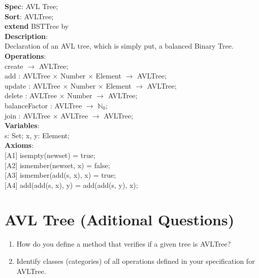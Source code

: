 \documentclass[12pt]{article}
\begin{document}
\begin{spacing}{1.5}
\noindent \textbf{Spec}: AVL Tree;\\
\noindent \textbf{Sort}: AVLTree;\\
\noindent \textbf{extend} BSTTree by\\
\noindent \textbf{Description}:\\Declaration of an AVL tree, which is simply put, a balanced Binary Tree.\\
\noindent \textbf{Operations}:\\
\hspace*{5mm} create $\rightarrow$ AVLTree;\\
\hspace*{5mm} add : AVLTree $\times$ Number $\times$ Element $\rightarrow$ AVLTree;\\
\hspace*{5mm} update : AVLTree $\times$ Number $\times$ Element $\rightarrow$ AVLTree;\\
\hspace*{5mm} delete : AVLTree $\times$ Number $\rightarrow$ AVLTree;\\
\hspace*{5mm} balanceFactor :  AVLTree $\rightarrow$ $\mathbb{N}_0$;\\
\hspace*{5mm} join : AVLTree $\times$ AVLTree $\rightarrow$ AVLTree;\\
\noindent \textbf{Variables}:\\
\hspace*{5mm} s: Set; x, y: Element;\\
\noindent \textbf{Axioms}:\\
\hspace*{5mm} [A1] isempty(newset) = true;\\
\hspace*{5mm} [A2] ismember(newset, x) = false;\\
\hspace*{5mm} [A3] ismember(add(s, x), x) = true;\\
\hspace*{5mm} [A4] add(add(s, x), y) = add(add(s, y), x);\\

\section*{AVL Tree (Aditional Questions)}

\begin{enumerate}

\item How do you define a method that verifies if a given tree is AVLTree?\\

\item Identify classes (categories) of all operations defined in your specification for AVLTree.\\

\end{enumerate}

\end{spacing}
\end{document}
